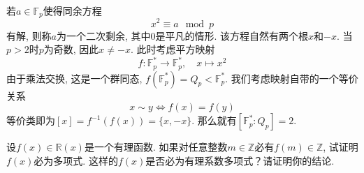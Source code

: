 \begin{remark}
    若$a \in \mathbb{F}_p$使得同余方程
    \[
        x^2 \equiv a \mod p
    \]
    有解, 则称$a$为一个二次剩余, 其中$0$是平凡的情形. 该方程自然有两个根$x$和$-x$. 当$p > 2$时$p$为奇数, 因此$x \neq -x$. 此时考虑平方映射
    \[
        f: \mathbb{F}_p^* \to \mathbb{F}_p^*,\quad x \mapsto x^2
    \]
    由于乘法交换, 这是一个群同态, $f(\mathbb{F}_p^*) = Q_p < \mathbb{F}_p^*$. 我们考虑映射自带的一个等价关系
    \[
        x \sim y \iff f(x) = f(y)
    \]
    等价类即为$[x] = f^{-1}(f(x)) = \{x, -x\}$. 那么就有$[\mathbb{F}_p^*:Q_p] = 2$.
\end{remark}

\begin{problem}
    设$f(x) \in \mathbb{R}(x)$是一个有理函数. 如果对任意整数$m \in \mathbb{Z}$必有$f(m) \in \mathbb{Z}$, 试证明$f(x)$必为多项式. 这样的$f(x)$是否必为有理系数多项式？请证明你的结论.
\end{problem}

